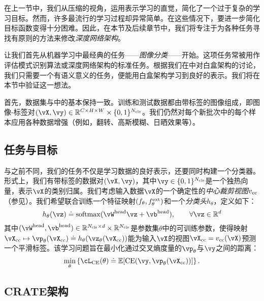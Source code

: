 \documentclass[../../book-main_zh.tex]{subfiles}
\begin{document}
\label{sec:image_classification}

在上一节中，我们从压缩的视角，运用表示学习的直觉，简化了一个过于复杂的学习目标。然而，许多最流行的学习过程却异常简单。在这些情况下，要进一步简化目标函数变得十分困难。因此，在本节及后续章节中，我们将专注于为各种任务寻找有原则的方法来修改\textit{深度网络架构}。

让我们首先从机器学习中最经典的任务——\textit{图像分类}——开始。这项任务常被用作评估模式识别算法或深度网络架构的标准任务。根据我们在中对白盒架构的讨论，我们只需要一个有语义意义的任务，便能用白盒架构学习到良好的表示。我们将在本节中验证这一想法。

首先，数据集与中的基本保持一致。训练和测试数据都由带标签的图像组成，即图像-标签对\((\vX, \vy) \in \R^{C \times H \times W} \times \{0, 1\}^{N_{\cls}}\)。我们仍然对每个新批次中的每个样本应用各种数据增强（例如，翻转、高斯模糊、日晒效果等）。

\subsection{任务与目标} \label{sub:image_classification_objective}

与之前不同，我们的任务不仅是学习数据的良好表示，还要同时构建一个分类器。形式上，我们有带标签的数据对\((\vX, \vy)\)，其中\(\vy \in \{0, 1\}^{N_{\cls}}\)是一个独热向量，表示\(\vX\)的类别归属。我们考虑输入数据\(\vX\)的一个确定性的\textit{中心裁剪视图}\(v_{\mathrm{cc}}\)（参见）。我们希望联合训练一个特征映射\((f_{\theta}, f_{\theta}^{\mathrm{ext}})\)和一个\textit{分类头}\(h_{\theta}\)，定义如下：
\begin{equation}
    h_{\theta}(\vz) \doteq \softmax(\vW^{\head}\vz + \vb^{\head}), \qquad  \forall \vz \in \R^{d}
\end{equation}
其中\((\vW^{\head}, \vb^{\head}) \in \R^{N_{\cls} \times d} \times \R^{N_{\cls}}\)是参数集\(\theta\)中的可训练参数，使得映射\(\vX_{\cc} \mapsto \vp_{\theta}(\vX_{\cc}) \doteq h_{\theta}(\vz_{\theta}(\vX_{\cc}))\)能为输入\(\vX\)的视图\(\vX_{\cc} = v_{\cc}(\vX)\)预测一个平滑标签。该学习问题旨在最小化通过交叉熵度量的\(\vp_{\theta}\)与\(\vy\)之间的距离：
\begin{equation}\label{eq:classification_ce_loss}
    \min_{\theta}\bc{\cL_{\CE}(\theta) \doteq \Ex[\CE(\vy, \vp_{\theta}(\vX_{\cc}))]}.
\end{equation}


\subsection{CRATE架构}\label{sub:image_classification_architecture}
\end{document}
